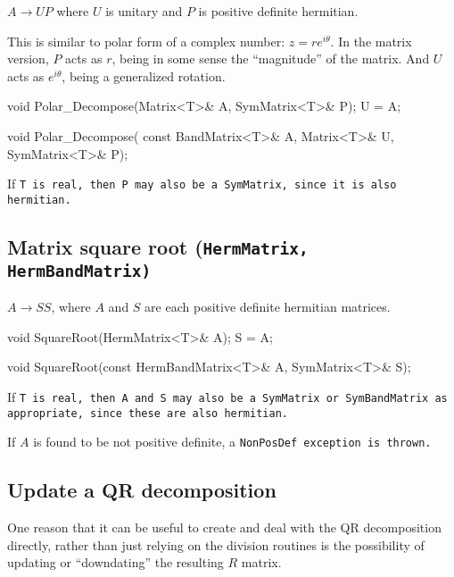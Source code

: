$A \rightarrow U P$ where $U$ is unitary and $P$ is positive definite hermitian.

This is similar to polar form of a complex number: $z = r e^{i \theta}$.
In the matrix version, $P$ acts as $r$, being in some sense the ``magnitude'' 
of the matrix.  And $U$ acts as $e^{i \theta}$, being a generalized rotation.

\begin{tmvcode}
void Polar_Decompose(Matrix<T>& A, SymMatrix<T>& P);
U = A;

void Polar_Decompose(
      const BandMatrix<T>& A, Matrix<T>& U, SymMatrix<T>& P);
\end{tmvcode}
If \tt{T} is real, then \tt{P} may also be a \tt{SymMatrix}, since it is also hermitian.

\subsection[Matrix square root] {Matrix square root \rm (\tt{HermMatrix}, \tt{HermBandMatrix})}

$A \rightarrow S S$, where $A$ and $S$ are each positive definite hermitian matrices.

\begin{tmvcode}
void SquareRoot(HermMatrix<T>& A);
S = A;

void SquareRoot(const HermBandMatrix<T>& A, SymMatrix<T>& S);
\end{tmvcode}
If \tt{T} is real, then \tt{A} and \tt{S} may also be a \tt{SymMatrix} or \tt{SymBandMatrix} as appropriate, since these are also hermitian.

If $A$ is found to be not positive definite, a \tt{NonPosDef} exception is thrown.

\subsection{Update a QR decomposition}
\label{QRUpdate}

One reason that it can be useful to create and deal with the QR decomposition directly,
rather than 
just relying on the division routines is the possibility
of updating or ``downdating'' the resulting $R$ matrix.  

